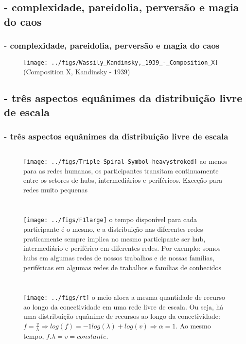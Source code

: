 \documentclass[10pt]{beamer}
\begin{document}
\subsection{- complexidade, pareidolia, perversão e magia do caos}
\begin{frame}
\frametitle{- complexidade, pareidolia, perversão e magia do caos}
\begin{figure}[!h]
    \texttt{[image: ../figs/Wassily\_Kandinsky,\_1939\_-\_Composition\_X]}\\
    (Composition X, Kandinsky - 1939)
        \label{fig:mesam}
\end{figure}
\end{frame}

\subsection{- três aspectos equânimes da distribuição livre de escala}
\begin{frame}
\frametitle{- três aspectos equânimes da distribuição livre de escala}
\begin{figure}
	\begin{columns}
		\texttt{[image: ../figs/Triple-Spiral-Symbol-heavystroked]}
ao menos para as redes humanas, os participantes transitam continuamente entre os setores de hubs, intermediários e periféricos. Exceção para redes muito pequenas
	\end{columns}
\end{figure}



\begin{figure}
	\begin{columns}
		\column{.2\textwidth}
		\texttt{[image: ../figs/F1large]}
		\column{.9\linewidth}
o tempo disponível para cada participante é o mesmo, e a distribuição nas diferentes redes praticamente sempre implica no mesmo participante ser hub, intermediário e periférico em diferentes redes. Por exemplo: somos hubs em algumas redes de nossos trabalhos e de nossas famílias, periféricas em algumas redes de trabalhos e famílias de conhecidos
	\end{columns}
\end{figure}



\begin{figure}
	\begin{columns}
		\column{.3\textwidth}
		\texttt{[image: ../figs/rt]}
		\column{.7\linewidth}
		o meio aloca a mesma quantidade de recurso ao longo da conectividade em uma rede livre de escala. Ou seja, há uma distribuição equânime de recursos ao longo da conectividade: $f=\frac{v}{\lambda} \Rightarrow log(f)=-1 log(\lambda) + log(v) \Rightarrow \alpha=1$. Ao mesmo tempo, $f . \lambda = v = constante$.
		\label{fig:example right}
	\end{columns}
\end{figure}

\end{frame}
\end{document}
